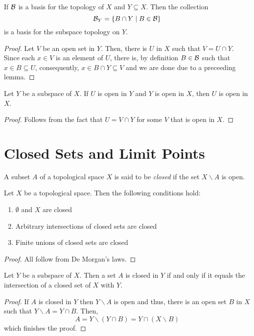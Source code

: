 \begin{lemma}
    If $\mathcal{B}$ is a basis for the topology of $X$ and $Y\subseteq X$. Then the collection 
    \begin{equation*}
        \mathcal{B}_Y = \{B\cap Y\mid B\in\mathcal{B}\}
    \end{equation*}
    is a basis for the subspace topology on $Y$.
\end{lemma}
\begin{proof}
    Let $V$ be an open set in $Y$. Then, there is $U$ in $X$ such that $V = U\cap Y$. Since each $x\in V$ is an element of $U$, there is, by definition $B\in\mathcal{B}$ such that $x\in B\subseteq U$, consequently, $x\in B\cap Y\subseteq V$ and we are done due to a preceeding lemma.
\end{proof}

\begin{proposition}
    Let $Y$ be a subspace of $X$. If $U$ is open in $Y$ and $Y$ is open in $X$, then $U$ is open in $X$.
\end{proposition}
\begin{proof}
    Follows from the fact that $U = V\cap Y$ for some $V$ that is open in $X$.
\end{proof}

\section{Closed Sets and Limit Points}
\begin{definition}
    A subset $A$ of a topological space $X$ is said to be \textit{closed} if the set $X\backslash A$ is open.
\end{definition}

\begin{theorem}
    Let $X$ be a topological space. Then the following conditions hold:
    \begin{enumerate}
        \item $\emptyset$ and $X$ are closed 
        \item Arbitrary intersections of closed sets are closed 
        \item Finite unions of closed sets are closed
    \end{enumerate}
\end{theorem}
\begin{proof}
    All follow from De Morgan's laws.
\end{proof}

\begin{proposition}
    Let $Y$ be a subspace of $X$. Then a set $A$ is closed in $Y$ if and only if it equals the intersection of a closed set of $X$ with $Y$.
\end{proposition}
\begin{proof}
    If $A$ is closed in $Y$ then $Y\backslash A$ is open and thus, there is an open set $B$ in $X$ such that $Y\backslash A = Y\cap B$. Then,
    \begin{equation*}
        A = Y\backslash(Y\cap B) = Y\cap(X\backslash B)
    \end{equation*}
    which finishes the proof.
\end{proof}

